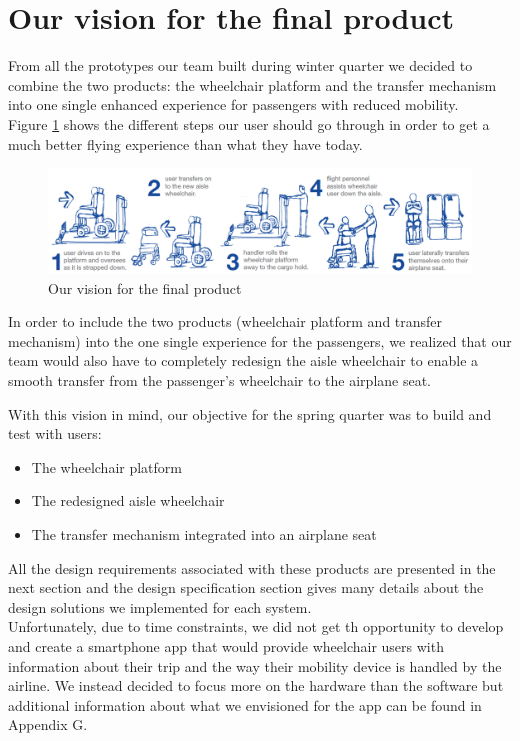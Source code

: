 \section{Our vision for the final product}

From all the prototypes our team built during winter quarter we decided to combine the two products: the wheelchair platform and the transfer mechanism into one single enhanced experience for passengers with reduced mobility. \\

Figure \ref{fig:our_vision} shows the different steps our user should go through in order to get a much better flying experience than what they have today. \\


\begin{figure}[h]
  \centering
     \includegraphics[width=16cm]{images/our_vision.png}
   \caption{Our vision for the final product}
  \label{fig:our_vision}
\end{figure}

In order to include the two products (wheelchair platform and transfer mechanism) into the one single experience for the passengers, we realized that our team would also have to completely redesign the aisle wheelchair to enable a smooth transfer from the passenger’s wheelchair to the airplane seat.\\

\newpage

With this vision in mind, our objective for the spring quarter was to build and test with users:
\begin{itemize}
\item The wheelchair platform
\item The redesigned aisle wheelchair
\item The transfer mechanism integrated into an airplane seat
\end{itemize}

All the design requirements associated with these products are presented in the next section and the design specification section gives many details about the design solutions we implemented for each system.\\

Unfortunately, due to time constraints, we did not get th opportunity to develop and create a smartphone app that would provide wheelchair users with information about their trip and the way their mobility device is handled by the airline. We instead decided to focus more on the hardware than the software but additional information about what we envisioned for the app can be found in Appendix G.

